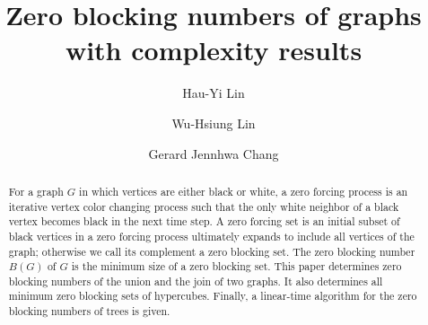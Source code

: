 \documentclass[preprint,12pt]{elsarticle}
\begin{document}
\begin{frontmatter}


\title{Zero blocking numbers of graphs with complexity results}
\author{Hau-Yi Lin}
\author{Wu-Hsiung Lin}
\author{Gerard Jennhwa Chang}
\address[nycu]{Department of Applied Mathematics, National Yang Ming Chiao Tung University, Hsinchu 30010, Taiwan}
\address[ntu]{Department of Mathematics, National Taiwan University, Taipei 10617, Taiwan}








\begin{abstract}
For a graph $G$ in which vertices are either black or white,
a {zero forcing process} is an iterative vertex color changing process such that
the only white neighbor of a black vertex becomes black in the next time step.
A {zero forcing set} is an initial subset of black vertices in a zero forcing process
ultimately expands to include all vertices of the graph;
otherwise we call its complement a {zero blocking set}.
The {zero blocking number} $B(G)$ of $G$ is the minimum size of a zero blocking set.
%
This paper determines zero blocking numbers of the union and the join of two graphs.
It also determines all minimum zero blocking sets of hypercubes.
Finally, a linear-time algorithm for the zero blocking numbers of trees is given.


\end{abstract}
\end{frontmatter}
\end{document}
